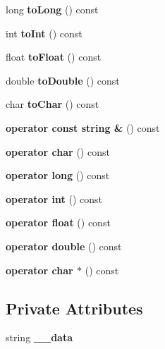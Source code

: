 \begin{CompactItemize}
\item 
long \textbf{toLong} () const \label{classVar_4b8ab77896158a56ba93d6c01e8d5589}

\item 
int \textbf{toInt} () const \label{classVar_a9f4bb634a37cea60419ffa813027eae}

\item 
float \textbf{toFloat} () const \label{classVar_f3a89b2ce7659ee5c56d113ac07fb557}

\item 
double \textbf{toDouble} () const \label{classVar_594a4b4f28b4aa725f6bf780312e187c}

\item 
char \textbf{toChar} () const \label{classVar_a9cf383b9c920c8bee4badefec924eb4}

\item 
\textbf{operator const string \&} () const \label{classVar_38d7b1016c27eb68252404797773e71a}

\item 
\textbf{operator char} () const \label{classVar_ee48faf68598e74fb4a6be959feb6a04}

\item 
\textbf{operator long} () const \label{classVar_8a7dbc82f15eb6167f097f2fed8a30d2}

\item 
\textbf{operator int} () const \label{classVar_e344617a87feb27a31d82fe5753f6824}

\item 
\textbf{operator float} () const \label{classVar_2ad0fb12c87741c232b74a65d402a278}

\item 
\textbf{operator double} () const \label{classVar_01e64417e2ac9ba93fb52988133ab5b7}

\item 
\textbf{operator char $\ast$} () const \label{classVar_061d4eddf83efaa79daa9bc8a1bcb31e}

\end{CompactItemize}
\subsection*{Private Attributes}
\begin{CompactItemize}
\item 
string \textbf{\_\-\_\-data}\label{classVar_155c960ed347bb236f5f91019d32bc25}

\end{CompactItemize}

